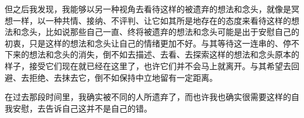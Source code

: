 但之后我发现，我能够以另一种视角去看待这样的被遗弃的想法和念头，就像是冥想一样，以一种共情、接纳、不评判、让它如其所是地存在的态度来看待这样的想法和念头，比如说那些自己一直、终将被遗弃的想法和念头可能是出于安慰自己的初衷，只是这样的想法和念头让自己的情绪更加不好。与其等待这一连串的、停不下来的想法和念头的消失，倒不如去描述、去看、去探索这样的想法和念头原本的样子，接受它们现在就已经在这里了，也许它们并不会马上就离开。与其希望去回避、去拒绝、去抹去它，倒不如保持中立地留有一定距离。

在过去那段时间里，我确实被不同的人所遗弃了，而也许我也确实很需要这样的自我安慰，去告诉自己这并不是自己的错。


